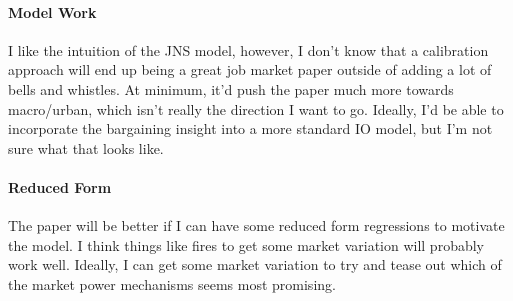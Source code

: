 \paragraph{Model Work}
I like the intuition of the JNS model, however, I don't know that a calibration approach will end up being a great job market paper outside of adding a lot of bells and whistles. At minimum, it'd push the paper much more towards macro/urban, which isn't really the direction I want to go. Ideally, I'd be able to incorporate the bargaining insight into a more standard IO model, but I'm not sure what that looks like.

\paragraph{Reduced Form}
The paper will be better if I can have some reduced form regressions to motivate the model. I think things like fires to get some market variation will probably work well. Ideally, I can get some market variation to try and tease out which of the market power mechanisms seems most promising.
